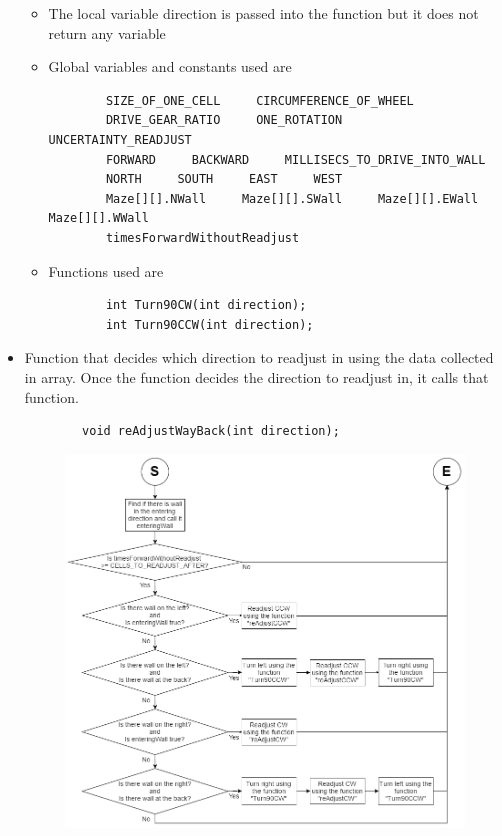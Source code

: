 \documentclass[11pt]{article}
\begin{document}
\begin{itemize}
\begin{figure}[htp]
\label{}
\end{figure}
	\begin{itemize}
	\item The local variable direction is passed into the function but it does not return any variable
	\item Global variables and constants used are
	\begin{verbatim}
		SIZE_OF_ONE_CELL     CIRCUMFERENCE_OF_WHEEL
		DRIVE_GEAR_RATIO     ONE_ROTATION     UNCERTAINTY_READJUST
		FORWARD     BACKWARD     MILLISECS_TO_DRIVE_INTO_WALL
		NORTH     SOUTH     EAST     WEST
		Maze[][].NWall     Maze[][].SWall     Maze[][].EWall     Maze[][].WWall
		timesForwardWithoutReadjust
	\end{verbatim}
	\item Functions used are
	\begin{verbatim}
		int Turn90CW(int direction);
		int Turn90CCW(int direction);
	\end{verbatim}
	\end{itemize}
\item Function that decides which direction to readjust in using the data collected in array. Once the function decides the direction to readjust in, it calls that function.
	\begin{verbatim}
		void reAdjustWayBack(int direction);
	\end{verbatim}
\begin{figure}[htp]
\centering
\includegraphics[scale=0.46]{images/Software_Flowchart/reAdjustWayBack.png}

\end{figure}
\end{itemize}
\end{document}
